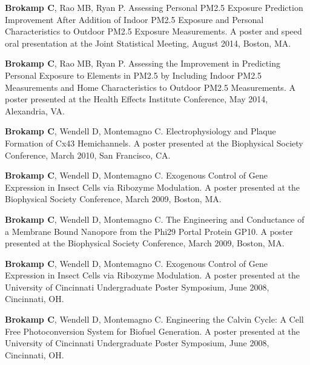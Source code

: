 \documentclass[margin,line]{res}
\newenvironment{list3}{
  \begin{list}{}{%
      \setlength{\itemsep}{0in}
      \setlength{\parsep}{0in} \setlength{\parskip}{0in}
      \setlength{\topsep}{0in} \setlength{\partopsep}{0in} 
      \setlength{\leftmargin}{0in}}}{\end{list}}
\begin{document}
\begin{resume}
\begin{list3}
\item[] \textbf{Brokamp C}, Rao MB, Ryan P. Assessing Personal PM2.5 Exposure Prediction Improvement After Addition of Indoor PM2.5 Exposure and Personal Characteristics to Outdoor PM2.5 Exposure Measurements. A poster and speed oral presentation at the Joint Statistical Meeting, August 2014, Boston, MA.
\item[] \textbf{Brokamp C}, Rao MB, Ryan P. Assessing the Improvement in Predicting Personal Exposure to Elements in PM2.5 by Including Indoor PM2.5 Measurements and Home Characteristics to Outdoor PM2.5 Measurements. A poster presented at the Health Effects Institute Conference, May 2014, Alexandria, VA.
\item[] \textbf{Brokamp C}, Wendell D, Montemagno C. Electrophysiology and Plaque Formation of Cx43 Hemichannels.  A poster presented at the Biophysical Society Conference, March 2010, San Francisco, CA.
\item[] \textbf{Brokamp C}, Wendell D, Montemagno C. Exogenous Control of Gene Expression in Insect Cells via Ribozyme Modulation. A poster presented at the Biophysical Society Conference, March 2009, Boston, MA.
\item[] \textbf{Brokamp C}, Wendell D, Montemagno C.  The Engineering and Conductance of a Membrane Bound Nanopore from the Phi29 Portal Protein GP10.  A poster presented at the Biophysical Society Conference, March 2009, Boston, MA.
\item[] \textbf{Brokamp C}, Wendell D, Montemagno C. Exogenous Control of Gene Expression in Insect Cells via Ribozyme Modulation.  A poster presented at the University of Cincinnati Undergraduate Poster Symposium, June 2008, Cincinnati, OH.
\item[] \textbf{Brokamp C}, Wendell D, Montemagno C. Engineering the Calvin Cycle: A Cell Free Photoconversion System for Biofuel Generation.  A poster presented at the University of Cincinnati Undergraduate Poster Symposium, June 2008, Cincinnati, OH.
\end{list3}


\end{resume}
\end{document}
